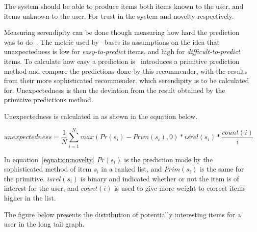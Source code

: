 The system should be able to produce items both items known to the user, and
items unknown to the user.  For trust in the system and novelty respectively.

Measuring serendipity can be done though measuring how hard the prediction was to do~\cite{serendipity}.
The metric used by~\cite{serendipity} bases its assumptions on the idea that unexpectedness is low for \emph{easy-to-predict} items, and high for \emph{difficult-to-predict} items.
To calculate how easy a prediction is~\cite{serendipity} introduces a primitive prediction method and compare the predictions done by this recommender, with the results from their more sophisticated recommender, which serendipity is to be calculated for.
Unexpectedness is then the deviation from the result obtained by the primitive predictions method.

Unexpectedness is calculated in as shown in the equation below.

\begin{equation}
    unexpectedness = \frac{1}{N}\sum_{i=1}^{N}{max(Pr(s_i) - Prim(s_i),0) * isrel(s_i) * \frac{count(i)}{i}}
    \label{equation:novelty}
\end{equation}

In equation~\ref{equation:novelty} $Pr(s_i)$ is the prediction made by the sophisticated method of item $s_i$ in a ranked list, and $Prim(s_i)$ is the same for the primitive.
$isrel(s_i)$ is binary and indicated whether or not the item is of interest for the user, and $count(i)$ is used to give more weight to correct items higher in the list.

The figure below presents the distribution of potentially interesting items for a user in the long tail graph.

